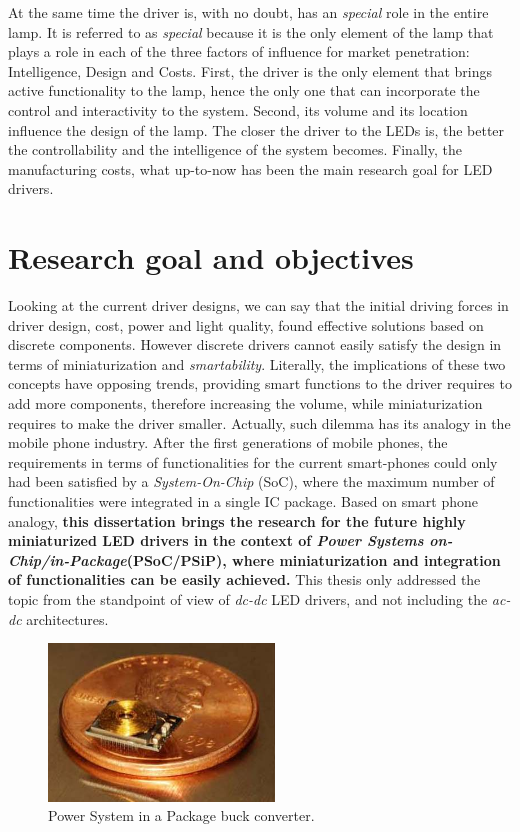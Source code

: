 At the same time the driver is, with no doubt, has an \emph{special} role in the entire lamp. It is referred to as \emph{special} because it is the only element of the lamp that plays a role in each of the three factors of influence for market penetration: Intelligence, Design and Costs. First, the driver is the only element that brings active functionality to the lamp, hence the only one that can incorporate the control and interactivity to the system. Second, its volume and its location influence the design of the lamp. The closer the driver to the LEDs is, the better the controllability and the intelligence of the system becomes. Finally, the manufacturing costs, what up-to-now has been the main research goal for LED drivers.



\section{Research goal and objectives}
Looking at the current driver designs, we can say that the initial driving forces in driver design, cost, power and light quality, found effective solutions based on discrete components. However discrete drivers cannot easily satisfy the design in terms of miniaturization and \emph{smartability}. Literally, the implications of these two concepts have opposing trends, providing smart functions to the driver requires to add more components, therefore increasing the volume, while miniaturization requires to make the driver smaller. Actually, such dilemma has its analogy in the mobile phone industry. After the first generations of mobile phones, the requirements in terms of functionalities for the current smart-phones could only had been satisfied by a \emph{System-On-Chip} (SoC), where the maximum number of functionalities were integrated in a single IC package. Based on smart phone analogy, \textbf{this dissertation brings the research for the future highly miniaturized LED drivers in the context of \emph{Power Systems on-Chip/in-Package}(PSoC/PSiP), where miniaturization and integration of functionalities can be easily achieved.} This thesis only addressed the topic from the standpoint of view of \emph{dc-dc} LED drivers, and not including the \emph{ac-dc} architectures.

\begin{figure}[!h]
    \centering
    \includegraphics[width=6cm]{./0_intro/img/FSolzbacher01.jpg}
    \caption{Power System in a Package buck converter.}
    \label{fig:psoc_example}
\end{figure}

